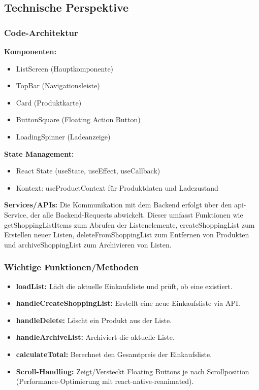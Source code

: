 \documentclass[12pt, a4paper]{report} %
\begin{document}
\subsection{Technische Perspektive}

\subsubsection{Code-Architektur}

\textbf{Komponenten:}
\begin{itemize}
    \item ListScreen (Hauptkomponente)
    \item TopBar (Navigationsleiste)
    \item Card (Produktkarte)
    \item ButtonSquare (Floating Action Button)
    \item LoadingSpinner (Ladeanzeige)
\end{itemize}

\noindent\textbf{State Management:}
\begin{itemize}
    \item React State (useState, useEffect, useCallback)
    \item Kontext: useProductContext für Produktdaten und Ladezustand
\end{itemize}

\noindent\textbf{Services/APIs:}
Die Kommunikation mit dem Backend erfolgt über den api-Service, der alle Backend-Requests abwickelt. Dieser umfasst Funktionen wie getShoppingListItems zum Abrufen der Listenelemente, createShoppingList zum Erstellen neuer Listen, deleteFromShoppingList zum Entfernen von Produkten und archiveShoppingList zum Archivieren von Listen.

\subsubsection{Wichtige Funktionen/Methoden}
\begin{itemize}
    \item \textbf{loadList:} Lädt die aktuelle Einkaufsliste und prüft, ob eine existiert.
    \item \textbf{handleCreateShoppingList:} Erstellt eine neue Einkaufsliste via API.
    \item \textbf{handleDelete:} Löscht ein Produkt aus der Liste.
    \item \textbf{handleArchiveList:} Archiviert die aktuelle Liste.
    \item \textbf{calculateTotal:} Berechnet den Gesamtpreis der Einkaufsliste.
    \item \textbf{Scroll-Handling:} Zeigt/Versteckt Floating Buttons je nach Scrollposition (Performance-Optimierung mit react-native-reanimated).
\end{itemize}
\end{document}
